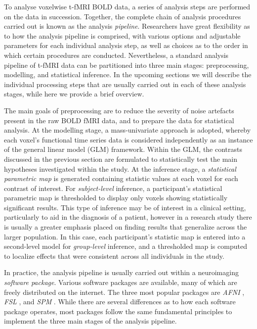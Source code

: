 To analyse voxelwise t-fMRI BOLD data, a series of analysis steps are performed on the data in succession. Together, the complete chain of analysis procedures carried out is known as the analysis \textit{pipeline}. Researchers have great flexibility as to how the analysis pipeline is comprised, with various options and adjustable parameters for each individual analysis step, as well as choices as to the order in which certain procedures are conducted. Nevertheless, a standard analysis pipeline of t-fMRI data can be partitioned into three main stages: preprocessing, modelling, and statistical inference. In the upcoming sections we will describe the individual processing steps that are usually carried out in each of these analysis stages, while here we provide a brief overview.

The main goals of preprocessing are to reduce the severity of noise artefacts present in the raw BOLD fMRI data, and to prepare the data for statistical analysis. At the modelling stage, a mass-univariate approach is adopted, whereby each voxel's functional time series data is considered independently as an instance of the general linear model (GLM) framework. Within the GLM, the contrasts discussed in the previous section are formulated to statistically test the main hypotheses investigated within the study. At the inference stage, a \textit{statistical parametric map} is generated containing statistic values at each voxel for each contrast of interest. For \textit{subject-level} inference, a participant's statistical parametric map is thresholded to display only voxels showing statistically significant results. This type of inference may be of interest in a clinical setting, particularly to aid in the diagnosis of a patient, however in a research study there is usually a greater emphasis placed on finding results that generalize across the larger population. In this case, each participant's statistic map is entered into a second-level model for \textit{group-level} inference, and a thresholded map is computed to localize effects that were consistent across all individuals in the study. 


In practice, the analysis pipeline is usually carried out within a neuroimaging \textit{software package}. Various software packages are available, many of which are freely distributed on the internet. The three most popular packages are \textit{AFNI} \citep{Cox1996-nu}, \textit{FSL} \citep{Jenkinson2012-wh}, and \textit{SPM} \citep{Penny2011-uk}. While there are several differences as to how each software package operates, most packages follow the same fundamental principles to implement the three main stages of the analysis pipeline.     


